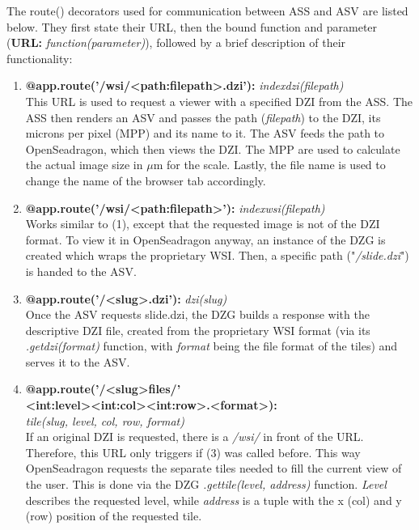 The route() decorators used for communication between ASS and ASV are listed below. They first state their URL, then the bound function and parameter (\textbf{URL:} \emph{function(parameter)}), followed by a brief description of their functionality:

\begin{enumerate}[(1) -]
	\item\textbf{@app.route('/wsi/{\textless}path:file{\textunderscore}path{\textgreater}.dzi'):} \emph{index{\textunderscore}dzi(file{\textunderscore}path)}\\
	This URL is used to request a viewer with a specified DZI from the ASS. The ASS then renders an ASV and passes the path (\emph{file{\textunderscore}path}) to the DZI, its microns per pixel (MPP) and its name to it. The ASV feeds the path to OpenSeadragon, which then views the DZI. The MPP are used to calculate the actual image size in $\mu$m for the scale. Lastly, the file name is used to change the name of the browser tab accordingly.
	
	\item \textbf{@app.route('/wsi/{\textless}path:file{\textunderscore}path{\textgreater}'):} \emph{index{\textunderscore}wsi(file{\textunderscore}path)}\\
	Works similar to (1), except that the requested image is not of the DZI format. To view it in OpenSeadragon anyway, an instance of the DZG is created which wraps the proprietary WSI. Then, a specific path ("\emph{/slide.dzi}") is handed to the ASV.
	
	\item \textbf{@app.route('/{\textless}slug{\textgreater}.dzi'):} \emph{dzi(slug)}\\
	Once the ASV requests slide.dzi, the DZG builds a response with the descriptive DZI file, created from the proprietary WSI format (via its \emph{.get{\textunderscore}dzi(format)} function, with \emph{format} being the file format of the tiles) and serves it to the ASV.
	
	\item \textbf{@app.route('/{\textless}slug{\textgreater}{\textunderscore}files/'\\{\textless}int:level{\textgreater}{\textunderscore}{\textless}int:col{\textgreater}{\textunderscore}{\textless}int:row{\textgreater}.{\textless}format{\textgreater}):}\\ \emph{tile(slug, level, col, row, format)}\\
	If an original DZI is requested, there is a \emph{/wsi/} in front of the URL. Therefore, this URL only triggers if (3) was called before. This way OpenSeadragon requests the separate tiles needed to fill the current view of the user. This is done via the DZG \emph{.get{\textunderscore}tile(level, address)} function. \emph{Level} describes the requested level, while \emph{address} is a tuple with the x (col) and y (row) position of the requested tile.
	

\end{enumerate}
